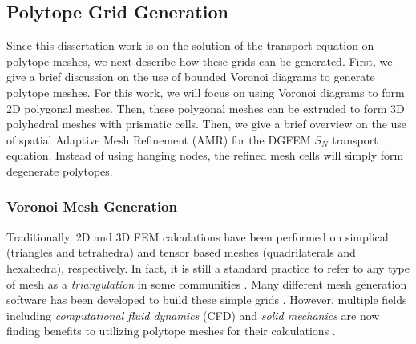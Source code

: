 \subsection{Polytope Grid Generation}
\label{sec::Intro_Past_Polytopes}

Since this dissertation work is on the solution of the transport equation on polytope meshes, we next describe how these grids can be generated. First, we give a brief discussion on the use of bounded Voronoi diagrams to generate polytope meshes. For this work, we will focus on using Voronoi diagrams to form 2D polygonal meshes. Then, these polygonal meshes can be extruded to form 3D polyhedral meshes with prismatic cells. Then, we give a brief overview on the use of spatial Adaptive Mesh Refinement (AMR) for the DGFEM $S_N$ transport equation. Instead of using hanging nodes, the refined mesh cells will simply form degenerate polytopes.

\subsubsection{Voronoi Mesh Generation}
\label{sec::Intro_Past_Polytopes_Voronoi}

Traditionally, 2D and 3D FEM calculations have been performed on simplical (triangles and tetrahedra) and tensor based meshes (quadrilaterals and hexahedra), respectively. In fact, it is still a standard practice to refer to any type of mesh as a {\em triangulation} in some communities \cite{ern2013theory}. Many different mesh generation software has been developed to build these simple grids \cite{shewchuk1996triangle,shewchuk2002delaunay,si2015tetgen,geuzaine2009gmsh}. However, multiple fields including {\em computational fluid dynamics} (CFD) and {\em solid mechanics} are now finding benefits to utilizing polytope meshes for their calculations \cite{ref::star_CCM,yip2005automated}.

